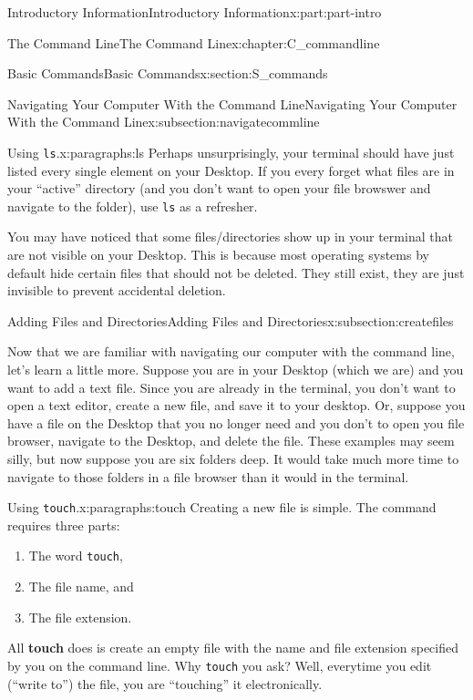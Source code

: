 \documentclass[oneside,10pt,]{book}
\newcommand{\mono}[1]{\texttt{#1}}
\newcommand{\terminology}[1]{\textbf{#1}}
\begin{document}
\begin{partptx}{Introductory Information}{}{Introductory Information}{}{}{x:part:part-intro}
\begin{chapterptx}{The Command Line}{}{The Command Line}{}{}{x:chapter:C_commandline}
\begin{sectionptx}{Basic Commands}{}{Basic Commands}{}{}{x:section:S_commands}
\begin{subsectionptx}{Navigating Your Computer With the Command Line}{}{Navigating Your Computer With the Command Line}{}{}{x:subsection:navigatecommline}
\begin{paragraphs}{Using \mono{ls}.}{x:paragraphs:ls}
Perhaps unsurprisingly, your terminal should have just listed every single element on your Desktop. If you every forget what files are in your ``active'' directory (and you don't want to open your file browswer and navigate to the folder), use \mono{ls} as a refresher.%
\par
You may have noticed that some files\slash{}directories show up in your terminal that are not visible on your Desktop. This is because most operating systems by default hide certain files that should not be deleted. They still exist, they are just invisible to prevent accidental deletion.%
\end{paragraphs}%
\end{subsectionptx}
%
%
\typeout{************************************************}
\typeout{************************************************}
%
\begin{subsectionptx}{Adding Files and Directories}{}{Adding Files and Directories}{}{}{x:subsection:createfiles}
%
\begin{introduction}{}%
Now that we are familiar with navigating our computer with the command line, let's learn a little more. Suppose you are in your Desktop (which we are) and you want to add a text file. Since you are already in the terminal, you don't want to open a text editor, create a new file, and save it to your desktop. Or, suppose you have a file on the Desktop that you no longer need and you don't to open you file browser, navigate to the Desktop, and delete the file. These examples may seem silly, but now suppose you are six folders deep. It would take much more time to navigate to those folders in a file browser than it would in the terminal.%
\end{introduction}%
\begin{paragraphs}{Using \mono{touch}.}{x:paragraphs:touch}%
\index{\mono{touch}}%
\index{command line!\mono{touch}}%
Creating a new file is simple. The command requires three parts:%
\begin{enumerate}
\item{}The word \mono{touch},%
\item{}The file name, and%
\item{}The file extension.%
\end{enumerate}
All \terminology{touch} does is create an empty file with the name and file extension specified by you on the command line. Why \mono{touch} you ask? Well, everytime you edit (``write to'') the file, you are ``touching'' it electronically.%

\end{paragraphs}
\end{subsectionptx}
\end{sectionptx}
\end{chapterptx}
\end{partptx}
\end{document}
